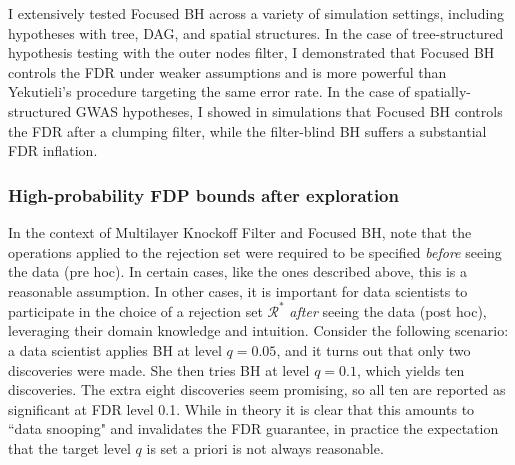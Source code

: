 \documentclass[11pt]{article}
\newcommand{\cR}{\mathcal R}
\begin{document}
I extensively tested Focused BH across a variety of simulation settings, including hypotheses with tree, DAG, and spatial structures. In the case of tree-structured hypothesis testing with the outer nodes filter, I demonstrated that Focused BH controls the FDR under weaker assumptions and is more powerful than Yekutieli's procedure \cite{Yekutieli} targeting the same error rate. In the case of spatially-structured GWAS hypotheses, I showed in simulations that Focused BH controls the FDR after a clumping filter, while the filter-blind BH suffers a substantial FDR inflation.


\subsubsection*{High-probability FDP bounds after exploration}

In the context of Multilayer Knockoff Filter and Focused BH, note that the operations applied to the rejection set were required to be specified \textit{before} seeing the data (pre hoc). In certain cases, like the ones described above, this is a reasonable assumption. In other cases, it is important for data scientists to participate in the choice of a rejection set $\cR^*$ \textit{after} seeing the data (post hoc), leveraging their domain knowledge and intuition. Consider the following scenario: a data scientist applies BH at level $q = 0.05$, and it turns out that only two discoveries were made. She then tries BH at level $q = 0.1$, which yields ten discoveries. The extra eight discoveries seem promising, so all ten are reported as significant at FDR level 0.1. While in theory it is clear that this amounts to ``data snooping" and invalidates the FDR guarantee, in practice the expectation that the target level $q$ is set a priori is not always reasonable. 
\end{document}
